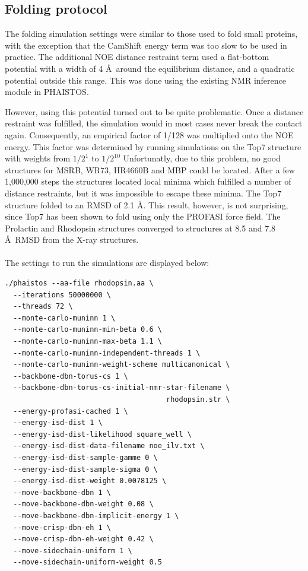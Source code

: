 \subsection{Folding protocol}


The folding simulation settings were similar to those used to fold small proteins, with the exception that the CamShift energy term was too slow to be used in practice.
The additional NOE distance restraint term used a flat-bottom potential with a width of 4 \AA~around the equilibrium distance, and a quadratic potential outside this range.
This was done using the existing NMR inference module in PHAISTOS.

However, using this potential turned out to be quite problematic. 
Once a distance restraint was fulfilled, the simulation would in most cases never break the contact again.
Consequently, an empirical factor of 1/128 was multiplied onto the NOE energy.
This factor was determined by running simulations on the Top7 structure with weights from $1/2^1$ to $1/2^{10}$
Unfortunatly, due to this problem, no good structures for MSRB, WR73, HR4660B and MBP could be located. 
After a few 1,000,000 steps the structures located local minima which fulfilled a number of distance restraints, but it was impossible to escape these minima.
The Top7 structure folded to an RMSD of 2.1 \AA.
This result, however, is not surprising, since Top7 has been shown to fold using only the PROFASI force field.
The Prolactin and Rhodopsin structures converged to structures at 8.5 and 7.8 \AA~RMSD from the X-ray structures.
\\\\The settings to run the simulations are displayed below:
\begin{lstlisting}
./phaistos --aa-file rhodopsin.aa \
  --iterations 50000000 \
  --threads 72 \
  --monte-carlo-muninn 1 \
  --monte-carlo-muninn-min-beta 0.6 \
  --monte-carlo-muninn-max-beta 1.1 \
  --monte-carlo-muninn-independent-threads 1 \
  --monte-carlo-muninn-weight-scheme multicanonical \
  --backbone-dbn-torus-cs 1 \
  --backbone-dbn-torus-cs-initial-nmr-star-filename \
                                      rhodopsin.str \
  --energy-profasi-cached 1 \
  --energy-isd-dist 1 \
  --energy-isd-dist-likelihood square_well \
  --energy-isd-dist-data-filename noe_ilv.txt \
  --energy-isd-dist-sample-gamme 0 \
  --energy-isd-dist-sample-sigma 0 \
  --energy-isd-dist-weight 0.0078125 \
  --move-backbone-dbn 1 \
  --move-backbone-dbn-weight 0.08 \
  --move-backbone-dbn-implicit-energy 1 \
  --move-crisp-dbn-eh 1 \
  --move-crisp-dbn-eh-weight 0.42 \
  --move-sidechain-uniform 1 \
  --move-sidechain-uniform-weight 0.5
\end{lstlisting}

